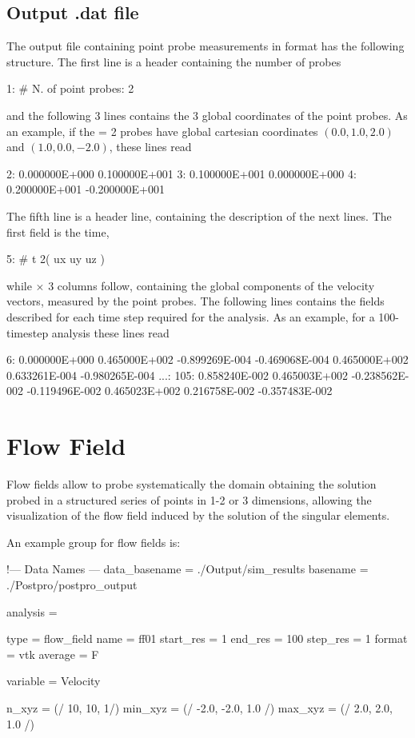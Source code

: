 \subsection{Output .dat file}

The output file containing point probe measurements in  format has 
the following structure. The first line is a header containing the number of probes
\begin{inputfile}[frame=single]
 1:  # N. of point probes:           2
\end{inputfile}
and the following 3 lines contains the 3 global coordinates of the point probes. 
As an example, if the  = 2 probes have global cartesian coordinates 
$(0.0,1.0,2.0)$ and $(1.0,0.0,-2.0)$, these lines read
\begin{inputfile}[frame=single]
 2:  0.000000E+000  0.100000E+001
 3:  0.100000E+001  0.000000E+000
 4:  0.200000E+001 -0.200000E+001
\end{inputfile}
The fifth line is a header line, containing the description of the next lines. 
The first field is the time,
\begin{inputfile}[frame=single]
 5:  #    t     2(   ux  uy  uz )
\end{inputfile}
while  $\times$ 3 columns follow, containing the global 
components of the velocity vectors, measured by the point probes. 
The following lines contains the fields described for each time step 
required for the analysis. As an example, for a 100-timestep analysis 
these lines read
\begin{inputfile}[frame=single]
  6: 0.000000E+000  0.465000E+002  -0.899269E-004  -0.469068E-004  0.465000E+002
     0.633261E-004 -0.980265E-004   
...:
105: 0.858240E-002  0.465003E+002  -0.238562E-002  -0.119496E-002  0.465023E+002
     0.216758E-002 -0.357483E-002
\end{inputfile}

\section{Flow Field}

Flow fields allow to probe systematically the domain obtaining the solution 
probed in a structured series of points in 1-2 or 3 dimensions, allowing the 
visualization of the flow field induced by the solution of the singular elements.

An example  group for flow fields is:

\begin{inputfile}[frame=single, caption={dust\_post.in for flow fields}, 
  label={file:dust_post.in_flow_fields}]
!--- Data Names ---
data_basename = ./Output/sim_results
basename =     ./Postpro/postpro_output

analysis = {

type = flow_field
name = ff01
start_res = 1
end_res   = 100 
step_res  = 1
format = vtk
average = F

variable = Velocity

n_xyz = (/ 10, 10, 1/)
min_xyz = (/ -2.0, -2.0, 1.0 /)
max_xyz = (/ 2.0, 2.0, 1.0 /)
}
\end{inputfile}

